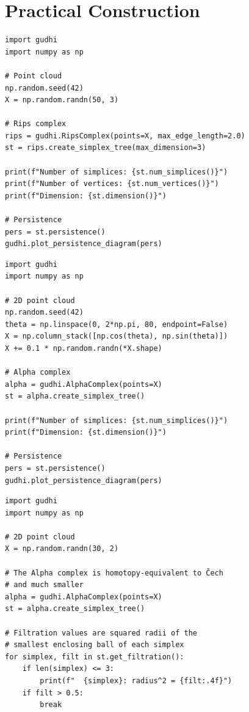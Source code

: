 \section{Practical Construction}

\begin{codeblock}[title=\textbf{Rips Complex with GUDHI}]
\begin{verbatim}
import gudhi
import numpy as np

# Point cloud
np.random.seed(42)
X = np.random.randn(50, 3)

# Rips complex
rips = gudhi.RipsComplex(points=X, max_edge_length=2.0)
st = rips.create_simplex_tree(max_dimension=3)

print(f"Number of simplices: {st.num_simplices()}")
print(f"Number of vertices: {st.num_vertices()}")
print(f"Dimension: {st.dimension()}")

# Persistence
pers = st.persistence()
gudhi.plot_persistence_diagram(pers)
\end{verbatim}
\end{codeblock}

\begin{codeblock}[title=\textbf{Alpha Complex with GUDHI}]
\begin{verbatim}
import gudhi
import numpy as np

# 2D point cloud
np.random.seed(42)
theta = np.linspace(0, 2*np.pi, 80, endpoint=False)
X = np.column_stack([np.cos(theta), np.sin(theta)])
X += 0.1 * np.random.randn(*X.shape)

# Alpha complex
alpha = gudhi.AlphaComplex(points=X)
st = alpha.create_simplex_tree()

print(f"Number of simplices: {st.num_simplices()}")
print(f"Dimension: {st.dimension()}")

# Persistence
pers = st.persistence()
gudhi.plot_persistence_diagram(pers)
\end{verbatim}
\end{codeblock}

\begin{codeblock}[title=\textbf{\v{C}ech Complex Approximation}]
\begin{verbatim}
import gudhi
import numpy as np

# 2D point cloud
X = np.random.randn(30, 2)

# The Alpha complex is homotopy-equivalent to Čech
# and much smaller
alpha = gudhi.AlphaComplex(points=X)
st = alpha.create_simplex_tree()

# Filtration values are squared radii of the
# smallest enclosing ball of each simplex
for simplex, filt in st.get_filtration():
    if len(simplex) <= 3:
        print(f"  {simplex}: radius^2 = {filt:.4f}")
    if filt > 0.5:
        break
\end{verbatim}
\end{codeblock}

